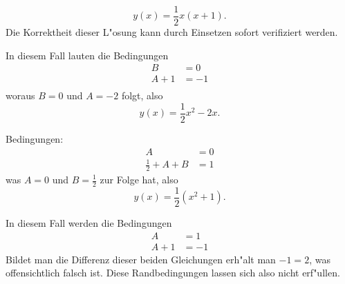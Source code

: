 \begin{loesung}
\begin{teilaufgaben}
\[
y(x)=\frac12x(x+1).
\]
Die Korrektheit dieser L"osung kann durch Einsetzen sofort
verifiziert werden.
\item In diesem Fall lauten die Bedingungen
\begin{align*}
B&=0\\
A+1&=-1\\
\end{align*}
woraus $B=0$ und $A=-2$ folgt, also
\[
y(x)=\frac12x^2-2x.
\]
\item
Bedingungen:
\begin{align*}
A&=0\\
\frac12+A+B&=1
\end{align*}
was $A=0$ und $B=\frac12$ zur Folge hat, also
\[
y(x)=\frac12(x^2+1).
\]
\item In diesem Fall werden die Bedingungen
\begin{align*}
A&=1\\
A+1&=-1
\end{align*}
Bildet man die Differenz dieser beiden Gleichungen
erh"alt man $-1=2$, was offensichtlich falsch ist. Diese
Randbedingungen lassen sich also nicht erf"ullen.
\end{teilaufgaben}
\end{loesung}
